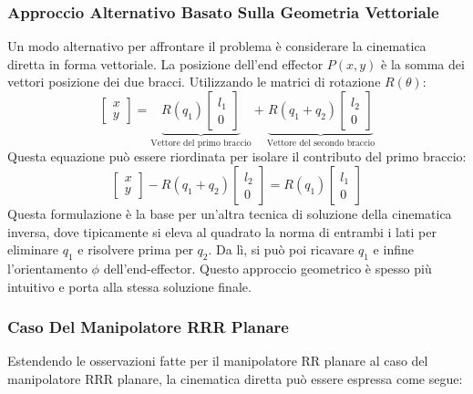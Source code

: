 \documentclass[11pt, a4paper]{report}
\begin{document}
\subsubsection*{Approccio Alternativo Basato Sulla Geometria Vettoriale}
Un modo alternativo per affrontare il problema è considerare la cinematica diretta in forma vettoriale. La posizione dell'end effector $P(x,y)$ è la somma dei vettori posizione dei due bracci. Utilizzando le matrici di rotazione $R(\theta)$:
\[
    \begin{bmatrix}
        x \\
        y
    \end{bmatrix}
    =
    \underbrace{R(q_1)
    \begin{bmatrix}
        l_1 \\
        0
    \end{bmatrix}}_{\text{Vettore del primo braccio}}
    +
    \underbrace{R(q_1 + q_2)
    \begin{bmatrix}
        l_2 \\
        0
    \end{bmatrix}}_{\text{Vettore del secondo braccio}}
\]
Questa equazione può essere riordinata per isolare il contributo del primo braccio:
\[
    \begin{bmatrix}
        x \\
        y
    \end{bmatrix}
    -R(q_1 + q_2)
    \begin{bmatrix}
        l_2 \\
        0
    \end{bmatrix}
    =
    R(q_1)
    \begin{bmatrix}
        l_1 \\
        0
    \end{bmatrix}
\]
Questa formulazione è la base per un'altra tecnica di soluzione della cinematica inversa, dove tipicamente si eleva al quadrato la norma di entrambi i lati per eliminare $q_1$ e risolvere prima per $q_2$. Da lì, si può poi ricavare $q_1$ e infine l'orientamento $\phi$ dell'end-effector. Questo approccio geometrico è spesso più intuitivo e porta alla stessa soluzione finale.
\newpage
\subsubsection*{Caso Del Manipolatore RRR Planare}
Estendendo le osservazioni fatte per il manipolatore RR planare al caso del manipolatore RRR planare, la cinematica diretta può essere espressa come segue:
\end{document}
